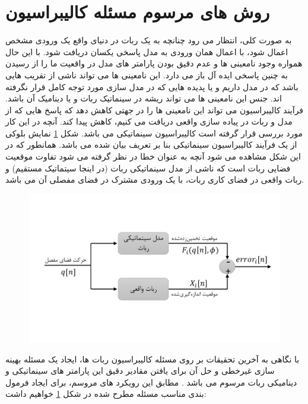 \section{روش های مرسوم مسئله کالیبراسیون} \label{seq:conventional_calibration}
به صورت کلی، انتظار می رود چنانچه به یک ربات در دنیای واقع یک ورودی مشخص اعمال شود، با اعمال همان ورودی به مدل پاسخی یکسان دریافت شود. با این حال همواره وجود نامعینی ها و عدم دقیق بودن پارامتر های مدل در واقعیت ما را از رسیدن به چنین پاسخی ایده آل باز می دارد. این نامعینی ها می تواند ناشی از تقریب هایی باشد که در مدل داریم و یا پدیده هایی که در مدل سازی مورد توجه کامل قرار نگرفته اند. جنس این نامعینی ها می تواند ریشه در سینماتیک ربات و یا دینامیک آن باشد. فرآیند کالیبراسیون می تواند این نامعینی ها را در جهتی کاهش دهد که پاسخ هایی که از مدل و ربات در پیاده سازی واقعی دریافت می کنیم، کاهش پیدا کند. آنچه در این کار مورد بررسی قرار گرفته است کالیبراسیون سینماتیکی می باشد. شکل \ref{fig:kinematicmodelerror} نمایش بلوکی از یک فرآیند کالیبراسیون سینماتیکی بنا بر تعریف بیان شده می باشد. همانطور که در این شکل مشاهده می شود آنچه به عنوان خطا در نظر گرفته می شود تفاوت موقعیت فضایی ربات است که ناشی از مدل سینماتیکی ربات (در اینجا سیتماتیک مستقیم) و ربات واقعی در فضای کاری ربات، با یک ورودی مشترک در فضای مفصلی آن می باشد. 

\begin{figure}[!t]
	\centering
	\includegraphics[width=0.8\linewidth, trim={0cm 2.2cm 0cm 2.2cm}, clip]{img/kinematic_model_error}
	\caption{}
	\label{fig:kinematicmodelerror}
\end{figure}


با نگاهی به آخرین تحقیقات بر روی مسئله کالیبراسیون ربات ها، ایجاد یک مسئله بهینه سازی غیرخطی و حل آن برای یافتن مقادیر دقیق این پارامتر های سینماتیکی و دینامیکی ربات مرسوم می باشد
\cite{elatta2004overview,ida2019automatic,ida2022identification,ida2021dynamics}.
مطابق این رویکرد های مروسم، برای ایجاد فرمول بندی مناسب مسئله مطرح شده در شکل \ref{fig:kinematicmodelerror} خواهیم داشت:

